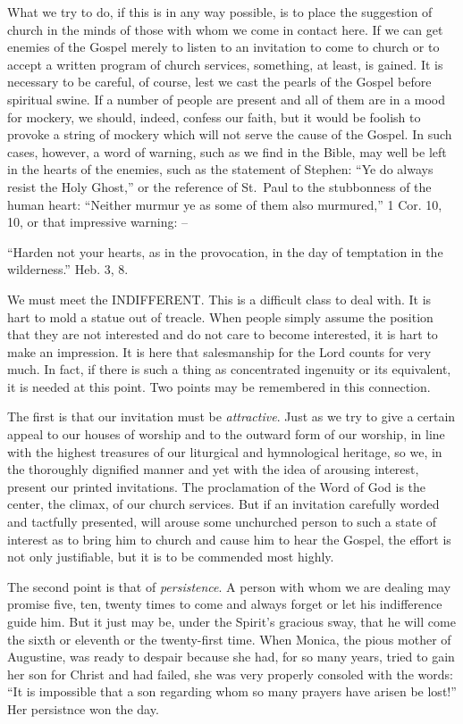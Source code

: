 \documentclass[
]{book}
\begin{document}
What we try to do, if this is in any way possible, is to place the suggestion of church in the minds of those with whom we come in contact here. If we can get enemies of the Gospel merely to listen to an invitation to come to church or to accept a written program of church services, something, at least, is gained. It is necessary to be careful, of course, lest we cast the pearls of the Gospel before spiritual swine. If a number of people are present and all of them are in a mood for mockery, we should, indeed, confess our faith, but it would be foolish to provoke a string of mockery which will not serve the cause of the Gospel. In such cases, however, a word of warning, such as we find in the Bible, may well be left in the hearts of the enemies, such as the statement of Stephen: ``Ye do always resist the Holy Ghost,'' or the reference of St.~Paul to the stubbonness of the human heart: ``Neither murmur ye as some of them also murmured,'' 1 Cor. 10, 10, or that impressive warning: --

``Harden not your hearts, as in the provocation, in the day of temptation in the wilderness.'' Heb. 3, 8.

We must meet the INDIFFERENT. This is a difficult class to deal with. It is hart to mold a statue out of treacle. When people simply assume the position that they are not interested and do not care to become interested, it is hart to make an impression. It is here that salesmanship for the Lord counts for very much. In fact, if there is such a thing as concentrated ingenuity or its equivalent, it is needed at this point. Two points may be remembered in this connection.

The first is that our invitation must be \emph{attractive}. Just as we try to give a certain appeal to our houses of worship and to the outward form of our worship, in line with the highest treasures of our liturgical and hymnological heritage, so we, in the thoroughly dignified manner and yet with the idea of arousing interest, present our printed invitations. The proclamation of the Word of God is the center, the climax, of our church services. But if an invitation carefully worded and tactfully presented, will arouse some unchurched person to such a state of interest as to bring him to church and cause him to hear the Gospel, the effort is not only justifiable, but it is to be commended most highly.

The second point is that of \emph{persistence}. A person with whom we are dealing may promise five, ten, twenty times to come and always forget or let his indifference guide him. But it just may be, under the Spirit's gracious sway, that he will come the sixth or eleventh or the twenty-first time. When Monica, the pious mother of Augustine, was ready to despair because she had, for so many years, tried to gain her son for Christ and had failed, she was very properly consoled with the words: ``It is impossible that a son regarding whom so many prayers have arisen be lost!'' Her persistnce won the day.
\end{document}
